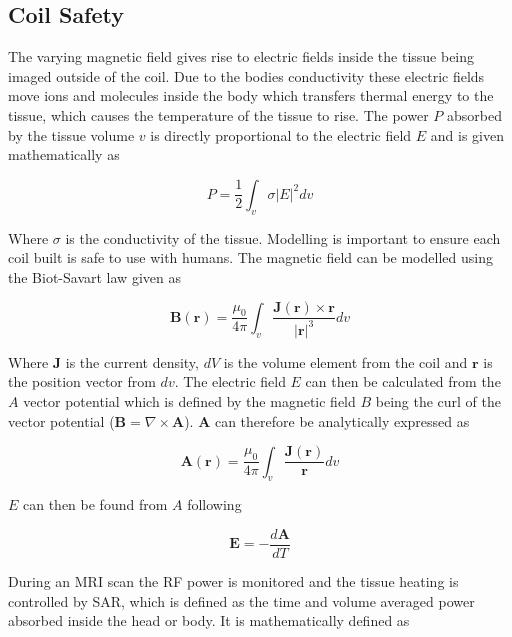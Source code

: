 \subsection{Coil Safety}

The varying magnetic field gives rise to electric fields inside the tissue being imaged outside of the coil. Due to the bodies conductivity these electric fields move ions and molecules inside the body which transfers thermal energy to the tissue, which causes the temperature of the tissue to rise. The power $P$ absorbed by the tissue volume $v$ is directly proportional to the electric field $E$ and is given mathematically as 

\begin{equation}
    P = \frac{1}{2}\int_v \sigma|E|^2dv
\end{equation}

Where $\sigma$ is the conductivity of the tissue. Modelling is important to ensure each coil built is safe to use with humans. The magnetic field can be modelled using the Biot-Savart law given as 

\begin{equation}
    \mathbf{B(r)} = \frac{\mu_0}{4\pi}\int_v\frac{\mathbf{J(\mathbf{r})} \times \mathbf{r}}{|\mathbf{r}|^3}dv
\end{equation}

Where $\mathbf{J}$ is the current density, $dV$ is the volume element from the coil and $\mathbf{r}$ is the position vector from $dv$. The electric field $E$ can then be calculated from the $A$ vector potential which is defined by the magnetic field $B$ being the curl of the vector potential ($\mathbf{B} = \nabla \times \mathbf{A}$). $\mathbf{A}$ can therefore be analytically expressed as 

\begin{equation}
    \mathbf{A(r)} = \frac{\mu_0}{4\pi}\int_v \frac{\mathbf{J(r)}}{\mathbf{r}}dv
\end{equation}

$E$ can then be found from $A$ following

\begin{equation}
    \mathbf{E} = -\frac{d\mathbf{A}}{dT}
\end{equation}

During an \ac{MRI} scan the \ac{RF} power is monitored and the tissue heating is controlled by \ac{SAR}, which is defined as the time and volume averaged power absorbed inside the head or body. It is mathematically defined as 


